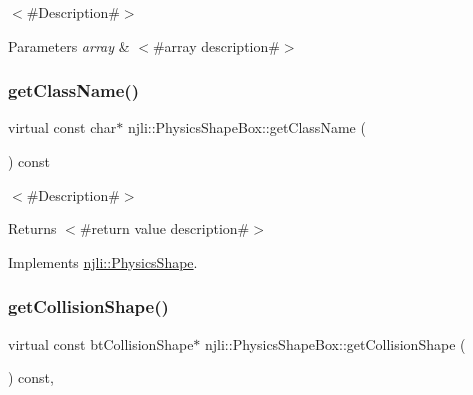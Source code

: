$<$\#\+Description\#$>$


\begin{DoxyParams}{Parameters}
{\em array} & $<$\#array description\#$>$ \\
\hline
\end{DoxyParams}
\mbox{\label{classnjli_1_1_physics_shape_box_af0500ac8a54d96ada3a3ab1b775fdd76}} 
\subsubsection{\texorpdfstring{get\+Class\+Name()}{getClassName()}}
{\footnotesize\ttfamily virtual const char$\ast$ njli\+::\+Physics\+Shape\+Box\+::get\+Class\+Name (\begin{DoxyParamCaption}{ }\end{DoxyParamCaption}) const\hspace{0.3cm}{\ttfamily [virtual]}}

$<$\#\+Description\#$>$

\begin{DoxyReturn}{Returns}
$<$\#return value description\#$>$ 
\end{DoxyReturn}


Implements \mbox{\hyperlink{classnjli_1_1_physics_shape_a72cb98a55614a3e264b8e4a157b45c64}{njli\+::\+Physics\+Shape}}.

\mbox{\label{classnjli_1_1_physics_shape_box_a5b2c32f5353b66f77a44fa53fde65d60}} 
\subsubsection{\texorpdfstring{get\+Collision\+Shape()}{getCollisionShape()}\hspace{0.1cm}{\footnotesize\ttfamily [1/2]}}
{\footnotesize\ttfamily virtual const bt\+Collision\+Shape$\ast$ njli\+::\+Physics\+Shape\+Box\+::get\+Collision\+Shape (\begin{DoxyParamCaption}{ }\end{DoxyParamCaption}) const\hspace{0.3cm}{\ttfamily [protected]}, {\ttfamily [virtual]}}



